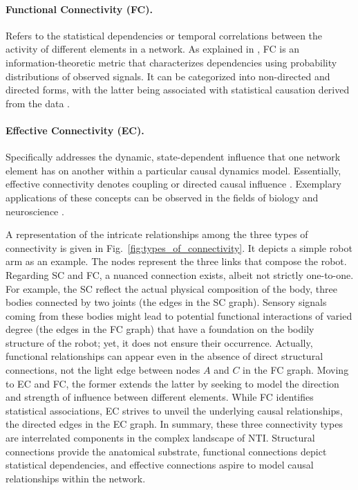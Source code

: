 \paragraph*{Functional Connectivity (FC).} Refers to the statistical dependencies or temporal correlations between the activity of different elements in a network. As explained in \cite{Friston2011Functionaleffectiveconnectivity}, FC is an information-theoretic metric that characterizes dependencies using probability distributions of observed signals. It can be categorized into non-directed and directed forms, with the latter being associated with statistical causation derived from the data \cite{Bastos2016tutorialreviewfunctional}. %

\paragraph*{Effective Connectivity (EC).} Specifically addresses the dynamic, state-dependent influence that one network element has on another within a particular causal dynamics model. Essentially, effective connectivity denotes coupling or directed causal influence \cite{Park2013Structuralfunctionalbrain}. Exemplary applications of these concepts can be observed in the fields of biology \cite{Zhang2017Networkbasedmachine} and neuroscience \cite{Karwowski2019Applicationgraphtheory,Sporns2018Graphtheorymethods}.

A representation of the intricate relationships among the three types of connectivity is given in Fig.~\ref{fig:types_of_connectivity}. It depicts a simple robot arm as an example. The nodes represent the three links that compose the robot. Regarding SC and FC, a nuanced connection exists, albeit not strictly one-to-one. For example, the SC reflect the actual physical composition of the body, three bodies connected by two joints (the edges in the SC graph). Sensory signals coming from these bodies might lead to potential functional interactions of varied degree (the edges in the FC graph) that have a foundation on the bodily structure of the robot; yet, it does not ensure their occurrence. Actually, functional relationships can appear even in the absence of direct structural connections, not the light edge between nodes $A$ and $C$ in the FC graph. Moving to EC and FC, the former extends the latter by seeking to model the direction and strength of influence between different elements. While FC identifies statistical associations, EC strives to unveil the underlying causal relationships, the directed edges in the EC graph. In summary, these three connectivity types are interrelated components in the complex landscape of NTI. Structural connections provide the anatomical substrate, functional connections depict statistical dependencies, and effective connections aspire to model causal relationships within the network.


